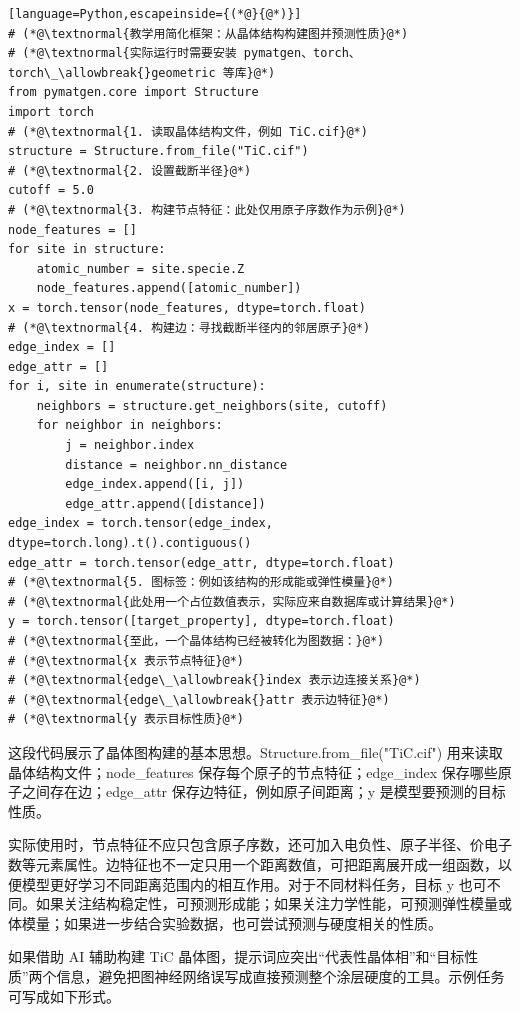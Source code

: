 \begin{lstlisting}[language=Python,escapeinside={(*@}{@*)}]
# (*@\textnormal{教学用简化框架：从晶体结构构建图并预测性质}@*)
# (*@\textnormal{实际运行时需要安装 pymatgen、torch、torch\_\allowbreak{}geometric 等库}@*)
from pymatgen.core import Structure
import torch
# (*@\textnormal{1. 读取晶体结构文件，例如 TiC.cif}@*)
structure = Structure.from_file("TiC.cif")
# (*@\textnormal{2. 设置截断半径}@*)
cutoff = 5.0
# (*@\textnormal{3. 构建节点特征：此处仅用原子序数作为示例}@*)
node_features = []
for site in structure:
    atomic_number = site.specie.Z
    node_features.append([atomic_number])
x = torch.tensor(node_features, dtype=torch.float)
# (*@\textnormal{4. 构建边：寻找截断半径内的邻居原子}@*)
edge_index = []
edge_attr = []
for i, site in enumerate(structure):
    neighbors = structure.get_neighbors(site, cutoff)
    for neighbor in neighbors:
        j = neighbor.index
        distance = neighbor.nn_distance
        edge_index.append([i, j])
        edge_attr.append([distance])
edge_index = torch.tensor(edge_index, dtype=torch.long).t().contiguous()
edge_attr = torch.tensor(edge_attr, dtype=torch.float)
# (*@\textnormal{5. 图标签：例如该结构的形成能或弹性模量}@*)
# (*@\textnormal{此处用一个占位数值表示，实际应来自数据库或计算结果}@*)
y = torch.tensor([target_property], dtype=torch.float)
# (*@\textnormal{至此，一个晶体结构已经被转化为图数据：}@*)
# (*@\textnormal{x 表示节点特征}@*)
# (*@\textnormal{edge\_\allowbreak{}index 表示边连接关系}@*)
# (*@\textnormal{edge\_\allowbreak{}attr 表示边特征}@*)
# (*@\textnormal{y 表示目标性质}@*)
\end{lstlisting}

这段代码展示了晶体图构建的基本思想。Structure.from\_\allowbreak{}file("TiC.cif") 用来读取晶体结构文件；node\_\allowbreak{}features 保存每个原子的节点特征；edge\_\allowbreak{}index 保存哪些原子之间存在边；edge\_\allowbreak{}attr 保存边特征，例如原子间距离；y 是模型要预测的目标性质。


实际使用时，节点特征不应只包含原子序数，还可加入电负性、原子半径、价电子数等元素属性。边特征也不一定只用一个距离数值，可把距离展开成一组函数，以便模型更好学习不同距离范围内的相互作用。对于不同材料任务，目标 y 也可不同。如果关注结构稳定性，可预测形成能；如果关注力学性能，可预测弹性模量或体模量；如果进一步结合实验数据，也可尝试预测与硬度相关的性质。


如果借助 AI 辅助构建 TiC 晶体图，提示词应突出“代表性晶体相”和“目标性质”两个信息，避免把图神经网络误写成直接预测整个涂层硬度的工具。示例任务可写成如下形式。

